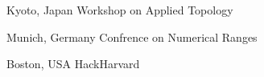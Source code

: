 {%
	Kyoto, Japan}
{%
	Workshop on Applied Topology}
{}

{%
	Munich, Germany}
{%
	Confrence on Numerical Ranges}
{}

{%
	Boston, USA}
{%
	HackHarvard}
{}
